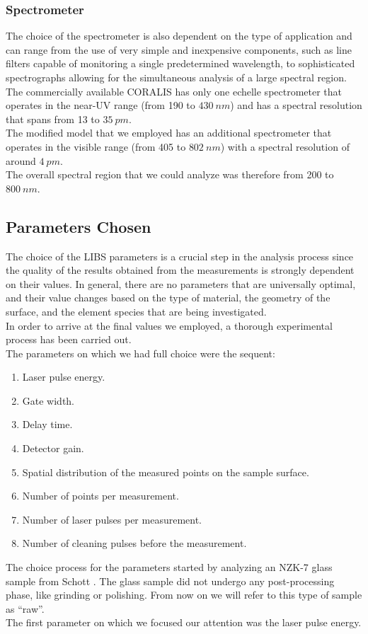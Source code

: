\subsubsection{Spectrometer}
\label{subsubsec:spectrometer}
The choice of the spectrometer is also dependent on the type of application and can range from the use of very simple and inexpensive components, such as line filters capable of monitoring a single predetermined wavelength, to sophisticated spectrographs allowing for the simultaneous analysis of a large spectral region.
\\
The commercially available CORALIS has only one echelle spectrometer that operates in the near-UV range (from 190 to $430 \: nm$) and has a spectral resolution that spans from 13 to $35 \: pm$.
\\
The modified model that we employed has an additional spectrometer that operates in the visible range (from 405 to $802\: nm$) with a spectral resolution of around $4 \: pm$.
\\
The overall spectral region that we could analyze was therefore from 200 to $800 \: nm$.

\subsection{Parameters Chosen}
\label{subsec:parameters_chosen}
The choice of the LIBS parameters is a crucial step in the analysis process since the quality of the results obtained from the measurements is strongly dependent on their values. In general, there are no parameters that are universally optimal, and their value changes based on the type of material, the geometry of the surface, and the element species that are being investigated.
\\
In order to arrive at the final values we employed, a thorough experimental process has been carried out.
\\
The parameters on which we had full choice were the sequent:
\begin{enumerate}
    \item Laser pulse energy.
    \item Gate width.
    \item Delay time.
    \item Detector gain.
    \item Spatial distribution of the measured points on the sample surface.
    \item Number of points per measurement.
    \item Number of laser pulses per measurement.
    \item Number of cleaning pulses before the measurement.
\end{enumerate}
The choice process for the parameters started by analyzing an NZK-7 glass sample from Schott \cite{NZK7SCHOTTAdvanced}. The glass sample did not undergo any post-processing phase, like grinding or polishing. From now on we will refer to this type of sample as “raw”.
\\
The first parameter on which we focused our attention was the laser pulse energy. 
